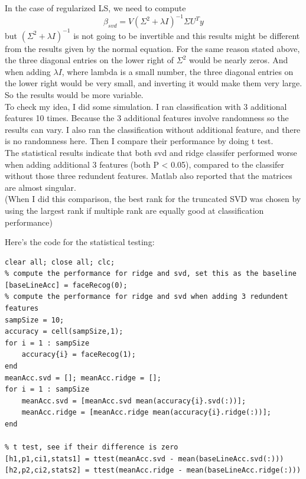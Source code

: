 \documentclass[paper=a4, fontsize=11pt]{scrartcl} %
\numberwithin{equation}{section} %
\numberwithin{figure}{section} %
\numberwithin{table}{section} %
\begin{document}
In the case of regularized LS, we need to compute 
$$ \beta_{svd} = V (\Sigma^2 + \lambda I)^{-1} \Sigma  U^T y $$ 
but $(\Sigma^2 + \lambda I)^{-1}$ is not going to be invertible and this results might be different from the results given by the normal equation. For the same reason stated above, the three diagonal entries on the lower right of $\Sigma^2$ would be nearly zeros. And when adding $\lambda I$, where lambda is a small number, the three diagonal entries on the lower right would be very small, and inverting it would make them very large. So the results would be more variable. \\ 


To check my idea, I did some simulation. I ran classification with 3 additional features 10 times. Because the 3 additional features involve randomness so the results can vary. I also ran the classification without additional feature, and there is no randomness here. Then I compare their performance by doing t test. \\

The statistical results indicate that both svd and ridge classifer performed worse when adding additional 3 features (both P < 0.05), compared to the classifer without those three redundent features. Matlab also reported that the matrices are almost singular. \\

(When I did this comparison, the best rank for the truncated SVD was chosen by using the largest rank if multiple rank are equally good at classification performance)

Here's the code for the statistical testing: 
\begin{lstlisting}
clear all; close all; clc; 
% compute the performance for ridge and svd, set this as the baseline
[baseLineAcc] = faceRecog(0);
% compute the performance for ridge and svd when adding 3 redundent features 
sampSize = 10;
accuracy = cell(sampSize,1);
for i = 1 : sampSize
    accuracy{i} = faceRecog(1);
end
meanAcc.svd = []; meanAcc.ridge = [];
for i = 1 : sampSize
    meanAcc.svd = [meanAcc.svd mean(accuracy{i}.svd(:))];
    meanAcc.ridge = [meanAcc.ridge mean(accuracy{i}.ridge(:))];
end

% t test, see if their difference is zero 
[h1,p1,ci1,stats1] = ttest(meanAcc.svd - mean(baseLineAcc.svd(:)))
[h2,p2,ci2,stats2] = ttest(meanAcc.ridge - mean(baseLineAcc.ridge(:)))

\end{lstlisting}
\end{document}

